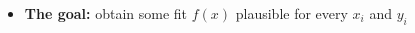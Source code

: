 \documentclass[usenames,dvipsnames,aspectratio=169]{beamer}
\begin{document}
\begin{frame}
\begin{columns}[t]
\begin{column}{0.275\textwidth}
    \vspace{10mm}

    \vspace{10mm}

    \vspace{10mm}
\end{column}


\end{columns}


\begin{itemize}
    \item {\bf The goal:} obtain some fit $f(x)$
    plausible for every $x_i$ and $y_i$

\end{itemize}

\end{frame}








\end{document}
